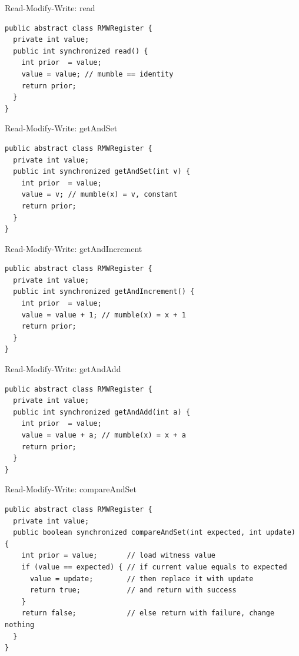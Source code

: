 \begin{frame}[t,fragile]{Read-Modify-Write: read}

\begin{verbatim}
public abstract class RMWRegister {
  private int value;
  public int synchronized read() {
    int prior  = value;
    value = value; // mumble == identity
    return prior;
  }
}
\end{verbatim}

\end{frame}

\begin{frame}{Read-Modify-Write: getAndSet}

\begin{verbatim}
public abstract class RMWRegister {
  private int value;
  public int synchronized getAndSet(int v) {
    int prior  = value;
    value = v; // mumble(x) = v, constant
    return prior;
  } 
}
\end{verbatim}

\end{frame}

\begin{frame}{Read-Modify-Write: getAndIncrement}

\begin{verbatim}
public abstract class RMWRegister {
  private int value;
  public int synchronized getAndIncrement() {
    int prior  = value;
    value = value + 1; // mumble(x) = x + 1
    return prior;
  }
}
\end{verbatim}
\end{frame}

\begin{frame}{Read-Modify-Write: getAndAdd}

\begin{verbatim}
public abstract class RMWRegister {
  private int value;
  public int synchronized getAndAdd(int a) {
    int prior  = value;
    value = value + a; // mumble(x) = x + a
    return prior;
  }
}
\end{verbatim}

\end{frame}

\begin{frame}{Read-Modify-Write: compareAndSet}

\begin{verbatim}
public abstract class RMWRegister {
  private int value;
  public boolean synchronized compareAndSet(int expected, int update) {
    int prior = value;       // load witness value
    if (value == expected) { // if current value equals to expected
      value = update;        // then replace it with update
      return true;           // and return with success
    }
    return false;            // else return with failure, change nothing
  }
}
\end{verbatim}

\end{frame}

